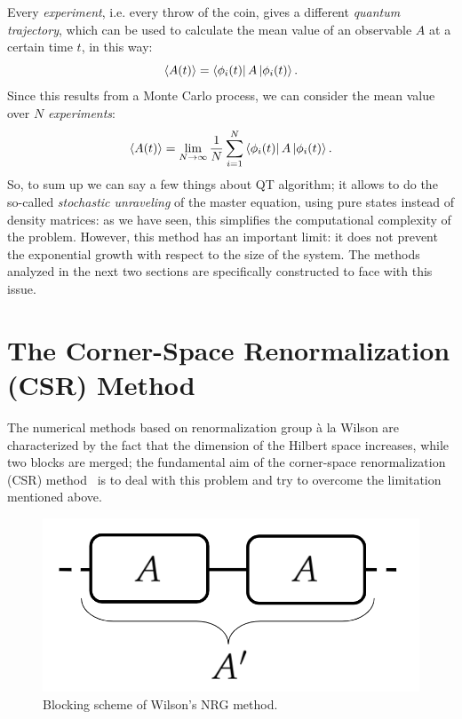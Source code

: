 Every \emph{experiment}, i.e. every throw of the coin, gives a different \emph{quantum trajectory}, which can be used to calculate the mean value of an observable $A$ at a certain time $t$, in this way:
\begin{equation}
    \langle A(t)\rangle = \bra{\phi_i(t)}A\ket{\phi_i(t)}.
\end{equation}
Since this results from a Monte Carlo process, we can consider the mean value over $N$ \emph{experiments}:
\begin{equation}
    \langle A(t)\rangle = \lim_{N\to\infty} \frac{1}{N}\sum_{i=1}^{N}\bra{\phi_i(t)}A\ket{\phi_i(t)}.
\end{equation}
So, to sum up we can say a few things about QT algorithm; it allows to do the so-called \emph{stochastic unraveling} of the master equation, using pure states instead of density matrices: as we have seen, this simplifies the computational complexity of the problem. However, this method has an important limit: it does not prevent the exponential growth with respect to the size of the system. The methods analyzed in the next two sections are specifically constructed to face with this issue.

\section{The Corner-Space Renormalization (CSR) Method}
\label{chapter3_csr}
The numerical methods based on renormalization group à la Wilson are characterized by the fact that the dimension of the Hilbert space increases, while two blocks are merged; the fundamental aim of the corner-space renormalization (CSR) method~\cite{PhysRevLett.115.080604} is to deal with this problem and try to overcome the limitation mentioned above. 


\begin{figure}[H]
    \centering
    \includegraphics[scale=0.3]{Figures/wilson.png}
    \captionsetup{width=1.\linewidth}
    \caption{Blocking scheme of Wilson's NRG method.}
    \label{fig:wilson}
\end{figure}


